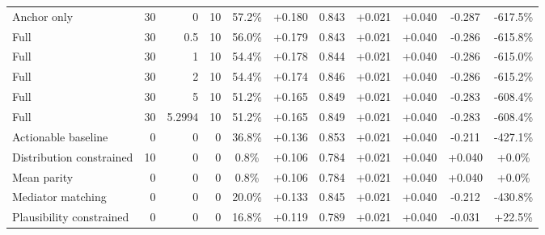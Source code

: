 \begin{table}[htbp]
\begin{tabular}{lrrrccccccc}
Anchor only & 30 & 0 & 10 & 57.2\% & +0.180 & 0.843 & +0.021 & +0.040 & -0.287 & -617.5\% \\
Full & 30 & 0.5 & 10 & 56.0\% & +0.179 & 0.843 & +0.021 & +0.040 & -0.286 & -615.8\% \\
Full & 30 & 1 & 10 & 54.4\% & +0.178 & 0.844 & +0.021 & +0.040 & -0.286 & -615.0\% \\
Full & 30 & 2 & 10 & 54.4\% & +0.174 & 0.846 & +0.021 & +0.040 & -0.286 & -615.2\% \\
Full & 30 & 5 & 10 & 51.2\% & +0.165 & 0.849 & +0.021 & +0.040 & -0.283 & -608.4\% \\
Full & 30 & 5.2994 & 10 & 51.2\% & +0.165 & 0.849 & +0.021 & +0.040 & -0.283 & -608.4\% \\
Actionable baseline & 0 & 0 & 0 & 36.8\% & +0.136 & 0.853 & +0.021 & +0.040 & -0.211 & -427.1\% \\
Distribution constrained & 10 & 0 & 0 & 0.8\% & +0.106 & 0.784 & +0.021 & +0.040 & +0.040 & +0.0\% \\
Mean parity & 0 & 0 & 0 & 0.8\% & +0.106 & 0.784 & +0.021 & +0.040 & +0.040 & +0.0\% \\
Mediator matching & 0 & 0 & 0 & 20.0\% & +0.133 & 0.845 & +0.021 & +0.040 & -0.212 & -430.8\% \\
Plausibility constrained & 0 & 0 & 0 & 16.8\% & +0.119 & 0.789 & +0.021 & +0.040 & -0.031 & +22.5\% \\
\bottomrule
\end{tabular}
\end{table}